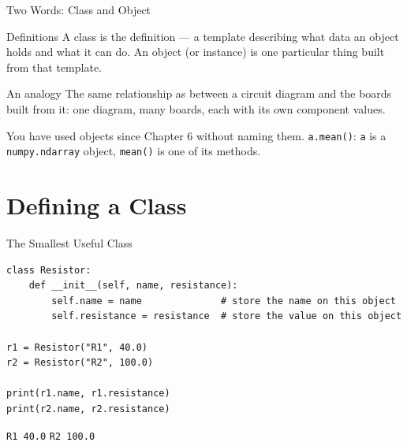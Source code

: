 \documentclass[9pt,aspectratio=169,xcolor=table]{beamer}
\begin{document}
\begin{frame}{Two Words: Class and Object}
    \leavevmode
    \begin{block}{Definitions}
        A \alert{class} is the definition --- a template describing what
        data an object holds and what it can do. An \alert{object} (or
        \alert{instance}) is one particular thing built from that
        template.
    \end{block}

    \vspace{3mm}
    \begin{alertblock}{An analogy}
        The same relationship as between a circuit diagram and the boards
        built from it: one diagram, many boards, each with its own
        component values.
    \end{alertblock}

    \vspace{3mm}
    \small You have used objects since Chapter 6 without naming them.
    \texttt{a.mean()}: \texttt{a} is a \texttt{numpy.ndarray} object,
    \texttt{mean()} is one of its methods.
\end{frame}

\section{Defining a Class}

\begin{frame}[fragile]{The Smallest Useful Class}
    \leavevmode
\begin{lstlisting}
class Resistor:
    def __init__(self, name, resistance):
        self.name = name              # store the name on this object
        self.resistance = resistance  # store the value on this object

r1 = Resistor("R1", 40.0)
r2 = Resistor("R2", 100.0)

print(r1.name, r1.resistance)
print(r2.name, r2.resistance)
\end{lstlisting}
    \texttt{R1 40.0} \qquad \texttt{R2 100.0}
\end{frame}
\end{document}
